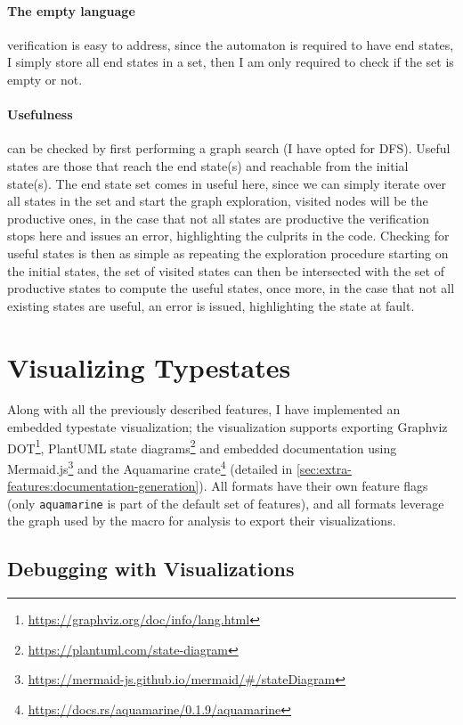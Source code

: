 \paragraph{The empty language} verification is easy to address, since the automaton is required to have end states,
I simply store all end states in a set, then I am only required to check if the set is empty or not.

\paragraph{Usefulness} can be checked by first performing a graph search (I have opted for \gls{DFS}).
Useful states are those that reach the end state(s)  and reachable from the initial state(s).
The end state set comes in useful here, since we can simply iterate over all states in the set and start the graph exploration,
visited nodes will be the productive ones, in the case that not all states are productive the verification stops here and issues an error,
highlighting the culprits in the code.
Checking for useful states is then as simple as repeating the exploration procedure starting on the initial states,
the set of visited states can then be intersected with the set of productive states to compute the useful states,
once more, in the case that not all existing states are useful, an error is issued, highlighting the state at fault.

\section{Visualizing Typestates}\label{sec:extra-features:automata-visualization}

Along with all the previously described features, I have implemented an embedded typestate visualization;
the visualization supports exporting Graphviz DOT\footnote{\url{https://graphviz.org/doc/info/lang.html}},
PlantUML state diagrams\footnote{\url{https://plantuml.com/state-diagram}} and
embedded documentation using Mermaid.js\footnote{\url{https://mermaid-js.github.io/mermaid/\#/stateDiagram}}
and the Aquamarine crate\footnote{\url{https://docs.rs/aquamarine/0.1.9/aquamarine}} (detailed in \autoref{sec:extra-features:documentation-generation}).
All formats have their own feature flags (only \texttt{aquamarine} is part of the default set of features),
and all formats leverage the graph used by the macro for analysis to export their visualizations.

\subsection{Debugging with Visualizations}

